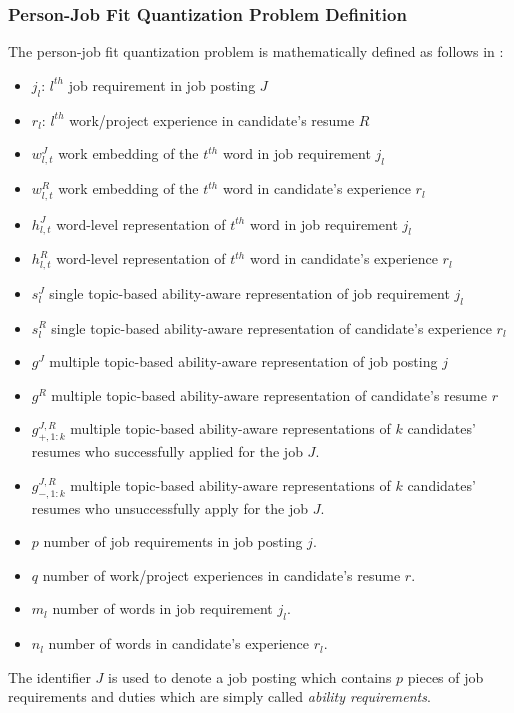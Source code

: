 \documentclass[draft,final]{thesisclass} %
\begin{document}
\subsubsection{Person-Job Fit Quantization Problem Definition}
The person-job fit quantization problem is mathematically defined as follows in \textcite[7-8]{pj_fit_ml}:
\begin{itemize}
    \item $j_l$: $l^{th}$ job requirement in job posting $J$
    \item $r_l$: $l^{th}$ work/project experience in candidate's resume $R$
    \item $w^J_{l,t}$ work embedding of the $t^{th}$ word in job requirement $j_l$
    \item $w^R_{l,t}$ work embedding of the $t^{th}$ word in candidate's experience $r_l$
    \item $h^J_{l,t}$ word-level representation of $t^{th}$ word in job requirement $j_l$
    \item $h^R_{l,t}$ word-level representation of $t^{th}$ word in candidate's experience $r_l$
    \item $s^J_l$ single topic-based ability-aware representation of job requirement $j_l$
    \item $s^R_l$ single topic-based ability-aware representation of candidate's experience $r_l$
    \item $g^J$ multiple topic-based ability-aware representation of job posting $j$
    \item $g^R$ multiple topic-based ability-aware representation of candidate's resume $r$
    \item $g^{J,R}_{+,1:k}$ multiple topic-based ability-aware representations of $k$ candidates' resumes who successfully applied for the job $J$.
    \item $g^{J,R}_{-,1:k}$ multiple topic-based ability-aware representations of $k$ candidates' resumes who unsuccessfully apply for the job $J$.
    \item $p$ number of job requirements in job posting $j$.
    \item $q$ number of work/project experiences in candidate's resume $r$.
    \item $m_l$ number of words in job requirement $j_l$.
    \item $n_l$ number of words in candidate's experience $r_l$.
\end{itemize}
The identifier $J$ is used to denote a job posting which contains $p$ pieces of job requirements and duties which are simply called \textit{ability requirements}.
\end{document}
